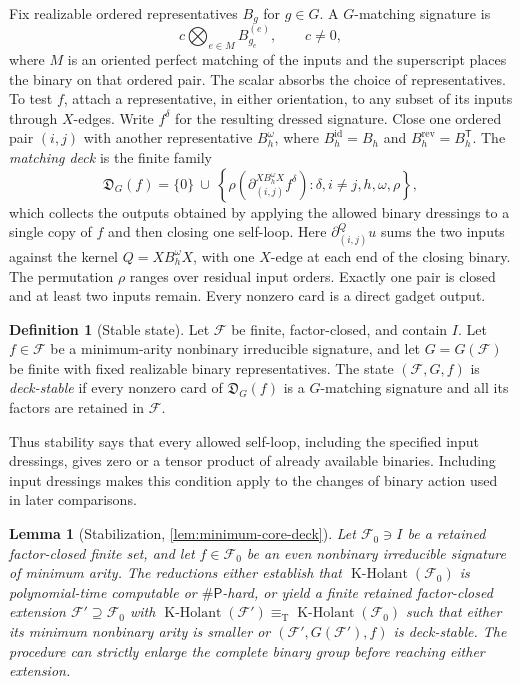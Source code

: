 \documentclass[11pt,letterpaper,onecolumn]{article}
\theoremstyle{plain}
\newtheorem{lemma}[lemma]{Lemma}
\theoremstyle{definition}
\newtheorem{definition}[definition]{Definition}
\theoremstyle{remark}
\newcommand{\cF}{\mathcal F}
\newcommand{\KHolant}{\operatorname{K\text{-}Holant}}
\newcommand{\SharpP}{\#\mathsf P}
\newcommand{\equivT}{\equiv_{\mathrm T}}
\begin{document}
Fix realizable ordered representatives \(B_g\) for \(g\in G\).
A \(G\)-matching signature is
\[
 c\bigotimes_{e\in M}B_{g_e}^{(e)},\qquad c\ne0,
\]
where \(M\) is an oriented perfect matching of the inputs and the
superscript places the binary on that ordered pair. The scalar absorbs
the choice of representatives. To test \(f\), attach a representative,
in either orientation, to any subset of its inputs through \(X\)-edges.
Write \(f^\delta\) for the resulting dressed signature. Close one ordered pair \((i,j)\)
with another representative \(B_h^\omega\), where
\(B_h^{\mathrm{id}}=B_h\) and \(B_h^{\mathrm{rev}}=B_h^{\mathsf T}\).
The \emph{matching deck} is the finite family
\[
 \mathfrak D_G(f)=\{0\}\ \cup\
 \left\{\rho\!\left(\partial_{(i,j)}^{XB_h^\omega X}f^\delta\right)
 :\delta,i\ne j,h,\omega,\rho\right\},
\]
which collects the outputs obtained by applying the allowed binary
dressings to a single copy of \(f\) and then closing one self-loop.
Here \(\partial_{(i,j)}^Q u\) sums the two inputs against the kernel
\(Q=XB_h^\omega X\), with one \(X\)-edge at each end of the closing binary. The permutation \(\rho\) ranges over residual input orders. Exactly one pair
is closed and at least two inputs remain. Every nonzero card is a direct
gadget output.

\begin{definition}[Stable state]
\label{s:short:stable}
Let \(\cF\) be finite, factor-closed, and contain \(I\). Let
\(f\in\cF\) be a minimum-arity nonbinary irreducible signature, and
let \(G=G(\cF)\) be finite with fixed realizable binary representatives.
The state \((\cF,G,f)\) is \emph{deck-stable} if every nonzero card
of \(\mathfrak D_G(f)\) is a \(G\)-matching signature and all its
factors are retained in \(\cF\).
\end{definition}

Thus stability says that every allowed self-loop, including the specified
input dressings, gives zero or a tensor product of already available
binaries. Including input dressings makes this condition apply to the changes of
binary action used in later comparisons.

\begin{lemma}[Stabilization, \cref{lem:minimum-core-deck}]
\label{s:short:stabilization}
Let \(\cF_0\ni I\) be a retained factor-closed finite set, and let
\(f\in\cF_0\) be an even nonbinary irreducible signature of minimum arity.
The reductions either establish that \(\KHolant(\cF_0)\) is
polynomial-time computable or \(\SharpP\)-hard, or yield a finite retained
factor-closed extension \(\cF'\supseteq\cF_0\) with
\(\KHolant(\cF')\equivT\KHolant(\cF_0)\) such that either its minimum
nonbinary arity is smaller or \((\cF',G(\cF'),f)\) is deck-stable.
The procedure can strictly enlarge the complete binary group before
reaching either extension.
\end{lemma}
\end{document}
